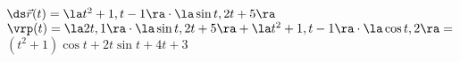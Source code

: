 {$\ds \vec r(t) = \la t^2+1, t-1\ra\cdot \la \sin t, 2t+5\ra$
}
{
$\vrp(t) = \la 2t,1\ra \cdot \la \sin t,2t+5\ra + \la t^2+1,t-1\ra\cdot\la \cos t, 2\ra =$\\
 $(t^2+1)\cos t+2t\sin t + 4t+3$
}


